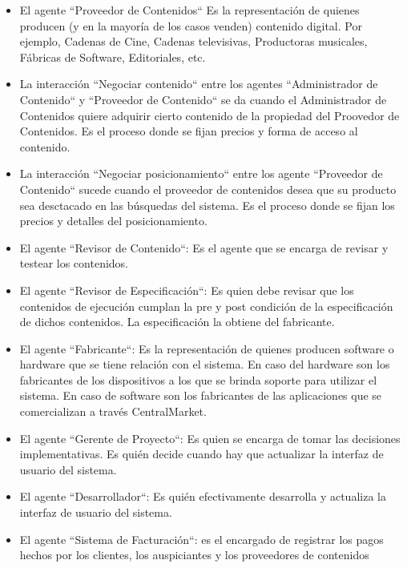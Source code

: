 \documentclass[11pt, a4paper, spanish]{article}
\begin{document}
\begin{itemize}
\item El agente ``Proveedor de Contenidos`` Es la representaci\'on de quienes producen (y en la mayor\'ia de los casos venden) contenido digital. Por ejemplo, Cadenas de Cine, Cadenas televisivas, Productoras musicales, F\'abricas de Software, Editoriales, etc. 

\item La interacci\'on ``Negociar contenido`` entre los agentes ``Administrador de Contenido`` y ``Proveedor de Contenido`` se da cuando el Administrador de Contenidos quiere adquirir cierto contenido de la propiedad del Proovedor de Contenidos. Es el proceso donde se fijan precios y forma de acceso al contenido.
   
\item La interacci\'on ``Negociar posicionamiento`` entre los agente ``Proveedor de Contenido`` sucede cuando el proveedor de contenidos desea que su producto sea desctacado en las b\'usquedas del sistema. Es el proceso donde se fijan los precios y detalles del posicionamiento.

\item El agente ``Revisor de Contenido``: Es el agente que se encarga de revisar y testear los contenidos.

\item El agente ``Revisor de Especificaci\'on``: Es quien debe revisar que los contenidos de ejecuci\'on cumplan la pre y post condici\'on de la especificaci\'on de dichos contenidos.
La especificaci\'on la obtiene del fabricante.

\item El agente ``Fabricante``: Es la representaci\'on de quienes producen software o hardware que se tiene relaci\'on con el sistema. En caso del hardware son los fabricantes de los dispositivos a los que se brinda soporte para utilizar el sistema. En caso de software son los fabricantes de las aplicaciones que se comercializan a trav\'es CentralMarket.

\item El agente ``Gerente de Proyecto``: Es quien se encarga de tomar las decisiones implementativas. Es qui\'en decide cuando hay que actualizar la interfaz de usuario del sistema.

\item El agente ``Desarrollador``: Es qui\'en efectivamente desarrolla y actualiza la interfaz de usuario del sistema.

\item El agente ``Sistema de Facturaci\'on``: es el encargado de registrar los pagos hechos por los clientes, los auspiciantes y los proveedores de contenidos



\end{itemize}
\end{document}
